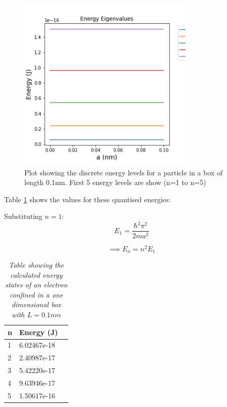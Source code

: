 \begin{figure}[h]
    \centering
    \includegraphics[width=0.75\textwidth]{lab1/images/eigenvaluesEnergy.png}
    \caption{Plot showing the discrete energy levels for a particle in a box of length 0.1nm. First 5 energy levels are show (n=1 to n=5)}
    \label{fig:eigenEnergy}
\end{figure}

Table \ref{tab:qEnerergy} shows the values for these quantised energies:

Substituting $n=1$:
$$E_1 = \frac{\hbar ^{2}\pi^{2}}{2ma^{2}}$$

\begin{equation}\label{eq:energySpacing}
\implies E_n =  n^{2}E_1
\end{equation}




\begin{table}[h!]
\centering
\begin{tabular}{|l|l|l|}
\hline
\textbf{n} & \textbf{Energy (J)} \\ \hline
1 & 6.02467e-18 \\ \hline
2 & 2.40987e-17 \\ \hline
3 & 5.42220e-17 \\ \hline
4 & 9.63946e-17 \\ \hline
5 & 1.50617e-16 \\ \hline
\end{tabular}
\caption{\textit{Table showing the calculated energy states of an electron confined in a one dimensional box with $L=0.1nm$}}
\label{tab:qEnerergy}
\end{table}

